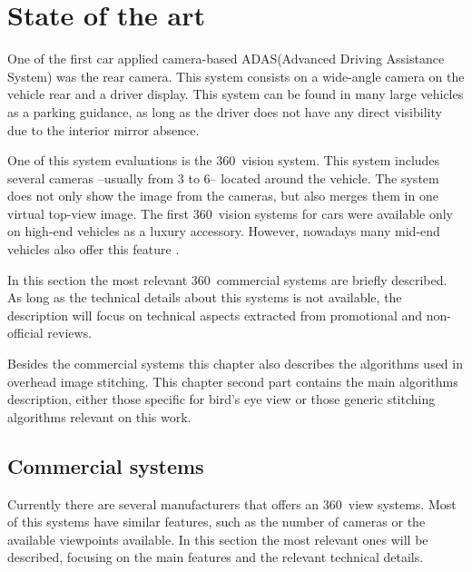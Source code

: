 \chapter{State of the art}\label{chapter:stateofheart}

One of the first car applied camera-based ADAS(Advanced Driving Assistance System) was the rear camera. This system consists on a wide-angle camera on the vehicle rear and a driver display. This system can be found in many large vehicles as a parking guidance, as long as the driver does not have any direct visibility due to the interior mirror absence.

One of this system evaluations is the 360\degree~vision system. This system includes several cameras --usually from 3 to 6-- located around the vehicle. The system does not only show the image from the cameras, but also merges them in one virtual top-view image. The first 360\degree~vision systems for cars were available only on high-end vehicles as a luxury accessory. However, nowadays many mid-end vehicles also offer this feature \cite{nissan}.

In this section the most relevant 360\degree~commercial systems are briefly described. As long as the technical details about this systems is not available, the description will focus on technical aspects extracted from promotional and non-official reviews.

Besides the commercial systems this chapter also describes the algorithms used in overhead image stitching. This chapter second part contains the main algorithms description, either those specific for bird's eye view or those generic stitching algorithms relevant on this work.

\section{Commercial systems}\label{sec:commercial_state}
Currently there are several manufacturers that offers an 360\degree~view systems. Most of this systems have similar features, such as the number of cameras or the available viewpoints available. In this section the most relevant ones will be described, focusing on the main features and the relevant technical details. 

